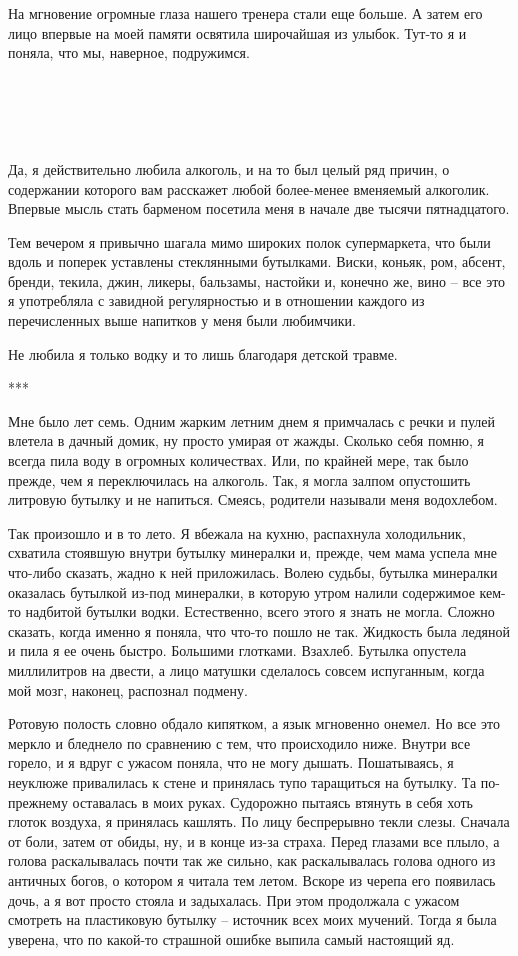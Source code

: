 \documentclass[
]{book}
\begin{document}
На мгновение огромные глаза нашего тренера стали еще больше. А затем его лицо впервые на моей памяти освятила широчайшая из улыбок. Тут-то я и поняла, что мы, наверное, подружимся.

\hypertarget{chapter-30}{%
\chapter{~}\label{chapter-30}}

Да, я действительно любила алкоголь, и на то был целый ряд причин, о содержании которого вам расскажет любой более-менее вменяемый алкоголик. Впервые мысль стать барменом посетила меня в начале две тысячи пятнадцатого.

Тем вечером я привычно шагала мимо широких полок супермаркета, что были вдоль и поперек уставлены стеклянными бутылками. Виски, коньяк, ром, абсент, бренди, текила, джин, ликеры, бальзамы, настойки и, конечно же, вино -- все это я употребляла с завидной регулярностью и в отношении каждого из перечисленных выше напитков у меня были любимчики.

Не любила я только водку и то лишь благодаря детской травме.

***

Мне было лет семь. Одним жарким летним днем я примчалась с речки и пулей влетела в дачный домик, ну просто умирая от жажды. Сколько себя помню, я всегда пила воду в огромных количествах. Или, по крайней мере, так было прежде, чем я переключилась на алкоголь. Так, я могла залпом опустошить литровую бутылку и не напиться. Смеясь, родители называли меня водохлебом.

Так произошло и в то лето. Я вбежала на кухню, распахнула холодильник, схватила стоявшую внутри бутылку минералки и, прежде, чем мама успела мне что-либо сказать, жадно к ней приложилась. Волею судьбы, бутылка минералки оказалась бутылкой из-под минералки, в которую утром налили содержимое кем-то надбитой бутылки водки. Естественно, всего этого я знать не могла. Сложно сказать, когда именно я поняла, что что-то пошло не так. Жидкость была ледяной и пила я ее очень быстро. Большими глотками. Взахлеб. Бутылка опустела миллилитров на двести, а лицо матушки сделалось совсем испуганным, когда мой мозг, наконец, распознал подмену.

Ротовую полость словно обдало кипятком, а язык мгновенно онемел. Но все это меркло и бледнело по сравнению с тем, что происходило ниже. Внутри все горело, и я вдруг с ужасом поняла, что не могу дышать. Пошатываясь, я неуклюже привалилась к стене и принялась тупо таращиться на бутылку. Та по-прежнему оставалась в моих руках. Судорожно пытаясь втянуть в себя хоть глоток воздуха, я принялась кашлять. По лицу беспрерывно текли слезы. Сначала от боли, затем от обиды, ну, и в конце из-за страха. Перед глазами все плыло, а голова раскалывалась почти так же сильно, как раскалывалась голова одного из античных богов, о котором я читала тем летом. Вскоре из черепа его появилась дочь, а я вот просто стояла и задыхалась. При этом продолжала с ужасом смотреть на пластиковую бутылку -- источник всех моих мучений. Тогда я была уверена, что по какой-то страшной ошибке выпила самый настоящий яд.
\end{document}
